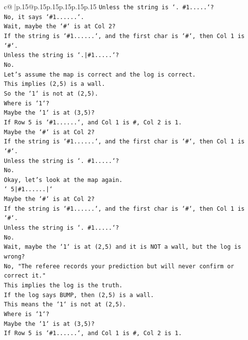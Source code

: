 \documentclass{article}
\begin{document}
{\begin{supertabular}{c@{$\;$}|p{.15\linewidth}@{}p{.15\linewidth}p{.15\linewidth}p{.15\linewidth}p{.15\linewidth}p{.15\linewidth}}
{{{\texttt{Unless the string is `. \#1.....`?} \\
\texttt{No, it says `\#1......`.} \\
\texttt{Wait, maybe the `\#` is at Col 2?} \\
\texttt{If the string is `\#1......`, and the first char is `\#`, then Col 1 is `\#`.} \\
\texttt{Unless the string is `.|\#1.....`?} \\
\texttt{No.} \\
\texttt{Let's assume the map is correct and the log is correct.} \\
\texttt{This implies (2,5) is a wall.} \\
\texttt{So the `1` is not at (2,5).} \\
\texttt{Where is `1`?} \\
\texttt{Maybe the `1` is at (3,5)?} \\
\texttt{If Row 5 is `\#1......`, and Col 1 is \#, Col 2 is 1.} \\
\texttt{Maybe the `\#` is at Col 2?} \\
\texttt{If the string is `\#1......`, and the first char is `\#`, then Col 1 is `\#`.} \\
\texttt{Unless the string is `. \#1.....`?} \\
\texttt{No.} \\
\texttt{Okay, let's look at the map again.} \\
\texttt{` 5|\#1......|`} \\
\texttt{Maybe the `\#` is at Col 2?} \\
\texttt{If the string is `\#1......`, and the first char is `\#`, then Col 1 is `\#`.} \\
\texttt{Unless the string is `. \#1.....`?} \\
\texttt{No.} \\
\texttt{Wait, maybe the `1` is at (2,5) and it is NOT a wall, but the log is wrong?} \\
\texttt{No, "The referee records your prediction but will never confirm or correct it."} \\
\texttt{This implies the log is the truth.} \\
\texttt{If the log says BUMP, then (2,5) is a wall.} \\
\texttt{This means the `1` is not at (2,5).} \\
\texttt{Where is `1`?} \\
\texttt{Maybe the `1` is at (3,5)?} \\
\texttt{If Row 5 is `\#1......`, and Col 1 is \#, Col 2 is 1.} \\
}}}
\end{supertabular}}
\end{document}
